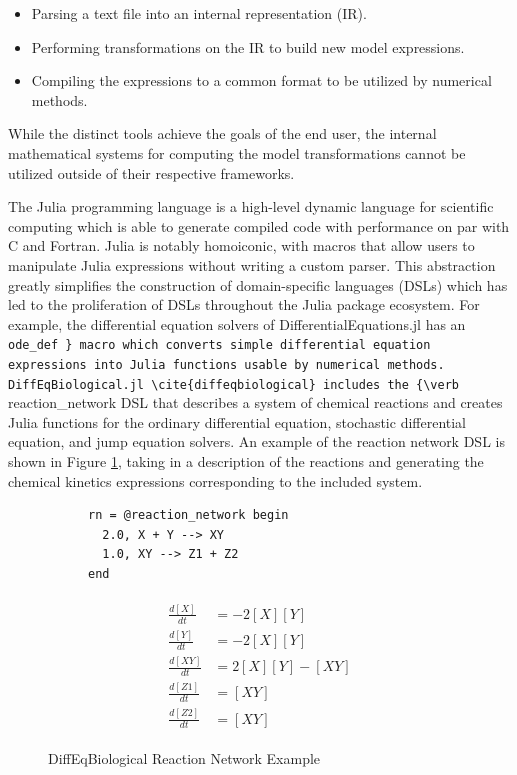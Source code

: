 \documentclass{juliacon}
\begin{document}
\begin{itemize}
    \item Parsing a text file into an internal representation (IR).
    \item Performing transformations on the IR to build new model expressions.
    \item Compiling the expressions to a common format to be utilized by numerical methods.
\end{itemize}

While the distinct tools achieve the goals of the end user, the internal mathematical systems for computing the model transformations cannot be utilized outside of their respective frameworks.

The Julia programming language \cite{bezanson_julia:_2017} is a high-level dynamic language for scientific computing which is able to generate compiled code with performance on par with C and Fortran. Julia is notably homoiconic, with macros that allow users to manipulate Julia expressions without writing a custom parser. This abstraction greatly simplifies the construction of domain-specific languages (DSLs) which has led to the proliferation of DSLs throughout the Julia package ecosystem. For example, the differential equation solvers of DifferentialEquations.jl \cite{christopher_rackauckas_differentialequations.jl_2017} has an {\verb @ode_def } macro which converts simple differential equation expressions into Julia functions usable by numerical methods. DiffEqBiological.jl \cite{diffeqbiological} includes the {\verb @reaction_network } DSL that describes a system of chemical reactions and creates Julia functions for the ordinary differential equation, stochastic differential equation, and jump equation solvers. An example of the reaction network DSL is shown in Figure \ref{code:reaction}, taking in a description of the reactions and generating the chemical kinetics expressions corresponding to the included system.

\begin{figure}
\begin{subfigure}[h]{0.45\textwidth}
\begin{lstlisting}
rn = @reaction_network begin
  2.0, X + Y --> XY               
  1.0, XY --> Z1 + Z2            
end
\end{lstlisting}
\end{subfigure}
\quad
\begin{subfigure}[h]{0.45\textwidth}
\begin{align*}
\begin{split}
    \frac{d[X]}{dt} &= -2 [X] [Y]\\
    \frac{d[Y]}{dt} &= -2 [X] [Y]\\
    \frac{d[XY]}{dt} &= 2 [X] [Y] - [XY]\\
    \frac{d[Z1]}{dt} &= [XY]\\
    \frac{d[Z2]}{dt} &= [XY]
\end{split}
\end{align*}
\end{subfigure}
\caption{DiffEqBiological Reaction Network Example}
\label{code:reaction}
\end{figure}
\end{document}

